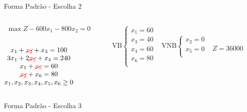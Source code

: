 \begin{frame}
{\begin{block}{Forma Padrão - {\color{cyan}Escolha 2}}
			\begin{columns}
				\begin{column}{0.35\textwidth}
					$
						\begin{matrix}
							\max Z - 600x_1 - 800x_2 = 0 \\
						\end{matrix}
					$ \\
					 \\
					$
						\begin{matrix}
							x_1  + {\color{red}\cancel{x_2}}  + x_3                   = 100 \\
							3x_1 + 2{\color{red}\cancel{x_2}}       + x_4             = 240 \\
							x_1                     + {\color{red}\cancel{x_5}}       = 60 \\
							{\color{red}\cancel{x_2}}                           + x_6 = 80 \\
							x_1,x_2, x_3, x_4, x_5, x_6 \ge 0 \\
						\end{matrix}
					$
				\end{column}
				\vline
				\hspace{0.1cm}
				\begin{column}{0.45\textwidth}
						$
							\begin{matrix}
								\text{VB} \left\{  \begin{matrix}
																 x_1 = 60 \\
																 x_3 = 40 \\
																 x_4 = 60 \\
																 x_6 = 80 \\
												   \end{matrix} 
										   \right.
								&
								\text{VNB} \left\{  \begin{matrix}
																 x_2 = 0 \\
																 x_5 = 0 \\
												   \end{matrix} 
										   \right. 
								\\
							 & \\
							\end{matrix}							
						$
						{\color{red}$ Z = 36000 $}
				\end{column}
			\end{columns}
		\end{block}
	}
	{
		\begin{block}{Forma Padrão - {\color{cyan}Escolha 3}}

\end{block}}
\end{frame}
